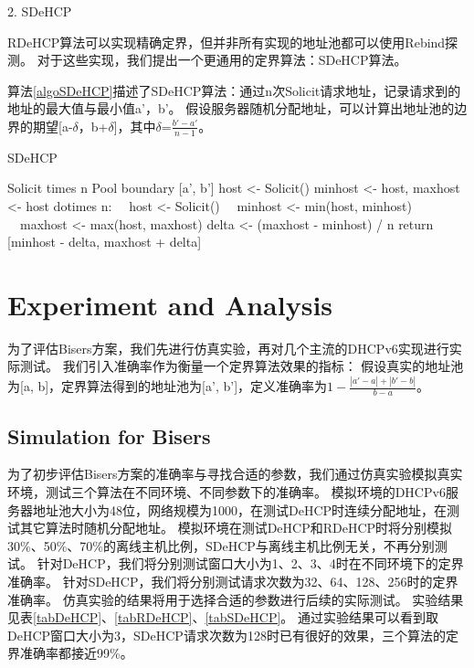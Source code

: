 \documentclass[UTF8]{article}
\begin{document}
2. SDeHCP

RDeHCP算法可以实现精确定界，但并非所有实现的地址池都可以使用Rebind探测。
对于这些实现，我们提出一个更通用的定界算法：SDeHCP算法。

算法\ref{algoSDeHCP}描述了SDeHCP算法：通过n次Solicit请求地址，记录请求到的地址的最大值与最小值a'，b'。
假设服务器随机分配地址，可以计算出地址池的边界的期望[a-$\delta$，b+$\delta$]，其中$\delta$=$\frac{b'-a'}{n-1}$。

\begin{algorithm}[H]
  \caption{SDeHCP}
  \label{algoSDeHCP}
  \renewcommand{\algorithmicrequire}{\textbf{Input:}}
  \renewcommand{\algorithmicensure}{\textbf{Output:}}
  \begin{algorithmic}[1]
    \REQUIRE Solicit times n
    \ENSURE Pool boundary [a', b']
    \STATE host <- Solicit()
    \STATE minhost <- host, maxhost <- host
    \STATE dotimes n:
    \STATE \ \ host <- Solicit()
    \STATE \ \ minhost <- min(host, minhost)
    \STATE \ \ maxhost <- max(host, maxhost)
    \STATE delta <- (maxhost - minhost) / n
    \STATE return [minhost - delta, maxhost + delta]
  \end{algorithmic}
\end{algorithm}

\section{Experiment and Analysis}

为了评估Bisers方案，我们先进行仿真实验，再对几个主流的DHCPv6实现进行实际测试。
我们引入准确率作为衡量一个定界算法效果的指标：
假设真实的地址池为[a, b]，定界算法得到的地址池为[a', b']，定义准确率为$1-\frac{|a'-a| + |b'-b|}{b-a}$。

\subsection{Simulation for Bisers}

为了初步评估Bisers方案的准确率与寻找合适的参数，我们通过仿真实验模拟真实环境，测试三个算法在不同环境、不同参数下的准确率。
模拟环境的DHCPv6服务器地址池大小为48位，网络规模为1000，在测试DeHCP时连续分配地址，在测试其它算法时随机分配地址。
模拟环境在测试DeHCP和RDeHCP时将分别模拟30\%、50\%、70\%的离线主机比例，SDeHCP与离线主机比例无关，不再分别测试。
针对DeHCP，我们将分别测试窗口大小为1、2、3、4时在不同环境下的定界准确率。
针对SDeHCP，我们将分别测试请求次数为32、64、128、256时的定界准确率。
仿真实验的结果将用于选择合适的参数进行后续的实际测试。
实验结果见表\ref{tabDeHCP}、\ref{tabRDeHCP}、\ref{tabSDeHCP}。
通过实验结果可以看到取DeHCP窗口大小为3，SDeHCP请求次数为128时已有很好的效果，三个算法的定界准确率都接近99\%。
\end{document}
